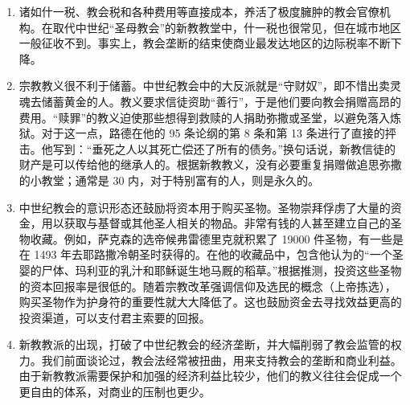 \begin{enumerate}
    \item 诸如什一税、教会税和各种费用等直接成本，养活了极度臃肿的教会官僚机构。在取代中世纪“圣母教会”的新教教堂中，什一税也很常见，但在城市地区一般征收不到。事实上，教会垄断的结束使商业最发达地区的边际税率不断下降。
    \item 宗教教义很不利于储蓄。中世纪教会中的大反派就是“守财奴”，即不惜出卖灵魂去储蓄黄金的人。教义要求信徒资助“善行”，于是他们要向教会捐赠高昂的费用。“赎罪”的教义迫使那些想得到救赎的人捐助弥撒或圣堂，以避免落入炼狱。对于这一点，路德在他的 95 条论纲的第 8 条和第 13 条进行了直接的抨击。他写到：“垂死之人以其死亡偿还了所有的债务。”换句话说，新教信徒的财产是可以传给他的继承人的。根据新教教义，没有必要重复捐赠做追思弥撒的小教堂；通常是 30 内，对于特别富有的人，则是永久的。
    \item 中世纪教会的意识形态还鼓励将资本用于购买圣物。圣物崇拜俘虏了大量的资金，用以获取与基督或其他圣人相关的物品。非常有钱的人甚至建立自己的圣物收藏。例如，萨克森的选帝候弗雷德里克就积累了 19000 件圣物，有一些是在 1493 年去耶路撒冷朝圣时获得的。在他的收藏品中，包含他认为的“一个圣婴的尸体、玛利亚的乳汁和耶稣诞生地马厩的稻草。”根据推测，投资这些圣物的资本回报率是很低的。随着宗教改革强调信仰及选民的概念（上帝拣选），购买圣物作为护身符的重要性就大大降低了。这也鼓励资金去寻找效益更高的投资渠道，可以支付君主索要的回报。
    \item 新教教派的出现，打破了中世纪教会的经济垄断，并大幅削弱了教会监管的权力。我们前面谈论过，教会法经常被扭曲，用来支持教会的垄断和商业利益。由于新教教派需要保护和加强的经济利益比较少，他们的教义往往会促成一个更自由的体系，对商业的压制也更少。

\end{enumerate}
